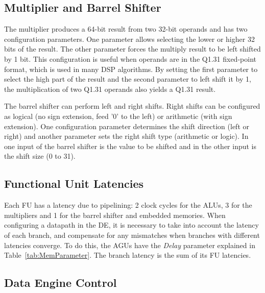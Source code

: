\subsection{Multiplier and Barrel Shifter}
\label{subsection:multiplierBarrelShifter}

The multiplier produces a 64-bit result from two 32-bit operands and
has two configuration parameters. One parameter allows selecting the
lower or higher 32 bits of the result. The other parameter forces the
multiply result to be left shifted by 1 bit. This configuration is
useful when operands are in the Q1.31 fixed-point format, which is
used in many DSP algorithms. By setting the first parameter to select
the high part of the result and the second parameter to left shift it
by 1, the multiplication of two Q1.31 operands also yields a Q1.31
result.

The barrel shifter can perform left and right shifts. Right shifts can
be configured as logical (no sign extension, feed '0' to the left) or
arithmetic (with sign extension). One configuration parameter
determines the shift direction (left or right) and another parameter
sets the right shift type (arithmetic or logic). In one input of the
barrel shifter is the value to be shifted and in the other input is
the shift size (0 to 31).

\subsection{Functional Unit Latencies}
\label{subsection:functionalUnitLatencies}

Each FU has a latency due to pipelining: 2 clock cycles for the ALUs,
3 for the multipliers and 1 for the barrel shifter and embedded
memories. When configuring a datapath in the DE, it is necessary to
take into account the latency of each branch, and compensate for any
mismatches when branches with different latencies converge. To do
this, the AGUs have the {\em Delay} parameter explained in
Table~\ref{tab:MemParameter}. The branch latency is the sum of its FU
latencies.

\subsection{Data Engine Control}
\label{subsection:dataEngineControl}


